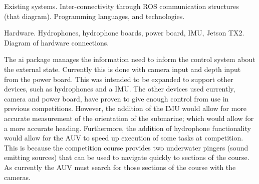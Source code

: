 Existing systems.
Inter-connectivity through ROS communication structures (that diagram).
Programming languages, and technologies.

Hardware.
Hydrophones, hydrophone boards, power board, IMU, Jetson TX2.
Diagram of hardware connections.

The ai package manages the information need to inform the control system about
the external state.
Currently this is done with camera input and depth input
from the power board.
This was intended to be expanded to support other devices,
such as hydrophones and a \gls{IMU}.
The other devices used currently, camera and power board, have proven to give
enough control from use in previous competitions.
However, the addition of the IMU would allow for more accurate measurement of
the orientation of the submarine; which would allow for a more accurate heading.
Furthermore, the addition of hydrophone functionality would allow for the AUV to
speed up execution of some tasks at competition.
This is because the competition course provides two underwater pingers (sound
emitting sources) that can be used to navigate quickly to sections of the
course.
As currently the AUV must search for those sections of the course with the
cameras.
